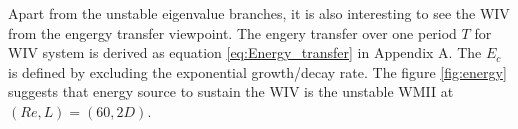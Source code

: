 
Apart from the unstable eigenvalue branches, it is also interesting to see the WIV from the engergy transfer viewpoint.
The engery transfer over one period $T$ for WIV system is derived as equation \ref{eq:Energy_transfer} 
in Appendix A. The $E_c$ is defined by excluding the exponential growth/decay rate. The figure \ref{fig:energy} suggests 
that energy source to sustain the WIV is the unstable WMII at $(Re,L)=(60,2D)$. 
 
\begin{figure}
\centering 
\begin{subfigure}{0.495\textwidth}
\centering
    \caption{}
    \label{•}
    \end{subfigure}  
\begin{subfigure}{0.495\textwidth}
\centering

\end{subfigure}
\end{figure}
